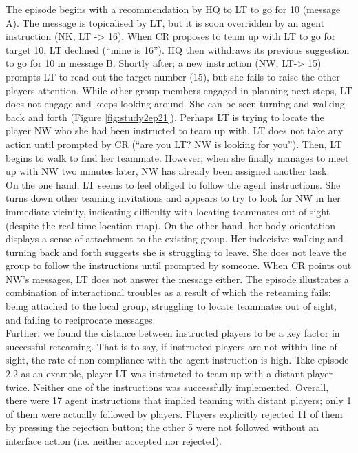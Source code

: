 The episode begins with a recommendation by HQ to LT to go for 10 (message A). The message is topicalised by LT, but it is soon overridden by an agent instruction (NK, LT -> 16). When CR proposes to team up with LT to go for target 10, LT declined (``mine is 16''). HQ then withdraws its previous suggestion to go for 10 in message B. Shortly after; a new instruction (NW, LT-> 15) prompts LT to read out the target number (15), but she fails to raise the other players attention. While other group members engaged in planning next steps, LT does not engage and keeps looking around. She can be seen turning and walking back and forth (Figure \ref{fig:study2ep21}). Perhaps LT is trying to locate the player NW who she had been instructed to team up with. LT does not take any action until prompted by CR (``are you LT? NW is looking for you''). Then, LT begins to walk to find her teammate. However, when she finally manages to meet up with NW two minutes later, NW has already been assigned another task. \\

On the one hand, LT seems to feel obliged to follow the agent instructions. She turns down other teaming invitations and appears to try to look for NW in her immediate vicinity, indicating difficulty with locating teammates out of sight (despite the real-time location map). On the other hand, her body orientation displays a sense of attachment to the existing group. Her indecisive walking and turning back and forth suggests she is struggling to leave. She does not leave the group to follow the instructions until prompted by someone. When CR points out NW's messages, LT does not answer the message either. The episode illustrates a combination of interactional troubles as a result of which the reteaming fails: being attached to the local group, struggling to locate teammates out of sight, and failing to reciprocate messages. \\

Further, we found the distance between instructed players to be a key factor in successful reteaming. That is to say, if instructed players are not within line of sight, the rate of non-compliance with the agent instruction is high. Take episode 2.2 as an example, player LT was instructed to team up with a distant player twice. Neither one of the instructions was successfully implemented. Overall, there were 17 agent instructions that implied teaming with distant players; only 1 of them were actually followed by players. Players explicitly rejected 11 of them by pressing the rejection button; the other 5 were not followed without an interface action (i.e. neither accepted nor rejected).\\

